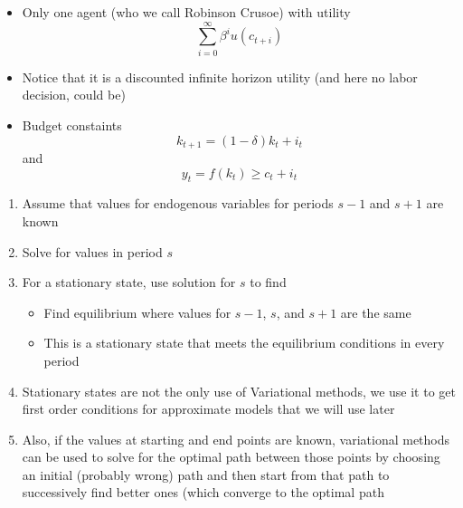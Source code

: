 \documentclass[notes=show]{beamer}
\begin{document}
\begin{frame}%


\begin{itemize}
\item Only one agent (who we call Robinson Crusoe) with utility%
\[
\sum_{i=0}^{\infty }\beta ^{i}u(c_{t+i}) 
\]

\item Notice that it is a discounted infinite horizon utility (and here no
labor decision, could be)

\item Budget constaints%
\[
k_{t+1}=(1-\delta )k_{t}+i_{t} 
\]%
and%
\[
y_{t}=f(k_{t})\geq c_{t}+i_{t} 
\]
\end{itemize}

\end{frame}%

\begin{frame}%



\begin{enumerate}
\item Assume that values for endogenous variables for periods $s-1$ and $s+1$
are known

\item Solve for values in period $s$

\item For a stationary state, use solution for $s$ to find

\begin{itemize}
\item Find equilibrium where values for $s-1$, $s$, and $s+1$ are the same

\item This is a stationary state that meets the equilibrium conditions in
every period
\end{itemize}

\item Stationary states are not the only use of Variational methods, we use
it to get first order conditions for approximate models that we will use
later

\item Also, if the values at starting and end points are known, variational
methods can be used to solve for the optimal path between those points by
choosing an initial (probably wrong) path and then start from that path to
successively find better ones (which converge to the optimal path
\end{enumerate}

\end{frame}%
\end{document}
